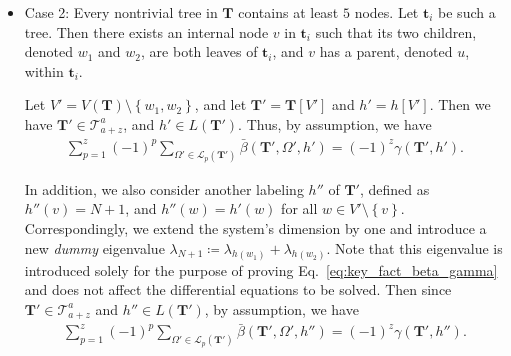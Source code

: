 \documentclass[superscriptaddress,onecolumn,nofootinbib,longbibliography,a4paper,accepted=2026-09-29]{quantumarticle}
\theoremstyle{plain}
\theoremstyle{definition}
\numberwithin{thm}{section}
\numberwithin{assumption}{section}
\numberwithin{lemma}{section}
\numberwithin{prop}{section}
\numberwithin{cor}{section}
\numberwithin{definition}{section}
\numberwithin{rmk}{section}
\numberwithin{equation}{section}
\newcommand{\lrcb}[1]{\left \{ #1 \right \}}
\newcommand{\defeq}{\coloneqq}
\newcommand{\mbt}{\mathbf{t}}
\newcommand{\mbf}{\mathbf{T}}
\begin{document}
\begin{itemize}
Now we combine Eqs.~\eqref{eq:induction_assumption}, \eqref{eq:induction_relation1},
\eqref{eq:induction_relation2} and \eqref{eq:induction_partition} and get
\begin{align}
\sum_{p=1}^{z+1} (-1)^p
\sum_{\Omega \in \mathcal{L}_{p}(\mbf)} 
\bar{\beta}(\mbf, \Omega, h)   
&=
-\frac{1}{\lambda_{h(w_1)}+\lambda_{h(w_2)}-\lambda_{h(v)}}
\sum_{p=1}^{z} (-1)^p
\sum_{\Omega' \in \mathcal{L}_{p}(\mbf')} 
\bar{\beta}(\mbf', \Omega', h')  \\
&=(-1)^{z+1}\frac{1}{\lambda_{h(w_1)}+\lambda_{h(w_2)}-\lambda_{h(v)}} \gamma(\mbf', h') \\
&=(-1)^{z+1}\gamma(\mbf, h),
\end{align}
where 
the last step follows from 
\begin{align}
\gamma(\mbf, h) = \gamma(\mbf', h') \cdot \frac{1}{\lambda_{h(w_1)}+\lambda_{h(w_2)}-\lambda_{h(v)}},
\end{align}
since the binary tree containing $v, w_1, w_2$ is isolated from the other trees in $\mbf$. Therefore, Eq.~\eqref{eq:key_fact_beta_gamma} holds for the labeled forest $(\mbf, h)$.

\item Case 2: Every nontrivial tree in $\mbf$ contains at  least $5$ nodes. Let $\mbt_i$ be such a tree. Then there exists an internal node $v$ in $\mbt_i$ such that its two children, denoted $w_1$ and $w_2$, are both leaves of $\mbt_i$, and $v$ has a parent, denoted $u$, within $\mbt_i$.

Let $V'=V(\mbf) \setminus \lrcb{w_1, w_2}$, and let
$\mbf'=\mbf[V']$ and $h'=h[V']$. Then we have $\mbf' \in \mathcal{T}^{a}_{a+z}$, and $h' \in L(\mbf')$. Thus, by assumption, we have
\begin{align}
\sum_{p=1}^{z} (-1)^p
\sum_{\Omega' \in \mathcal{L}_{p}(\mbf')} 
\bar{\beta}(\mbf', \Omega', h')
= (-1)^{z} \gamma(\mbf', h').
\label{eq:induction_assumption2}
\end{align}

In addition, we also consider another labeling $h''$ of $\mbf'$, defined as $h''(v)=N+1$, and $h''(w)=h'(w)$ for all $w \in V'\setminus\lrcb{v}$. Correspondingly, we extend the system's dimension by one and introduce a new \emph{dummy} eigenvalue $\lambda_{N+1}\defeq \lambda_{h(w_1)}+\lambda_{h(w_2)}$. Note that this eigenvalue is introduced solely for the purpose of proving Eq.~\eqref{eq:key_fact_beta_gamma} and does not affect the differential equations to be solved. Then since $\mbf' \in \mathcal{T}^{a}_{a+z}$ and $h'' \in L(\mbf')$,
by assumption, we have
\begin{align}
\sum_{p=1}^{z} (-1)^p
\sum_{\Omega' \in \mathcal{L}_{p}(\mbf')} 
\bar{\beta}(\mbf', \Omega', h'')
= (-1)^{z} \gamma(\mbf', h'').
\label{eq:induction_assumption3}
\end{align}


\end{itemize}
\end{document}
